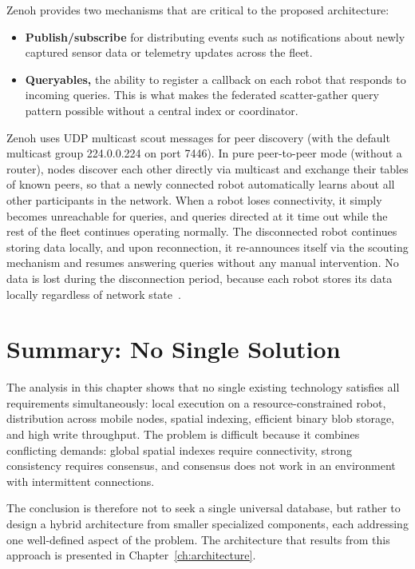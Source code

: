 Zenoh provides two mechanisms that are critical to the proposed architecture:
\begin{itemize}
    \item \textbf{Publish/subscribe} for distributing events such as notifications about newly captured sensor data or telemetry updates across the fleet.
    \item \textbf{Queryables,} the ability to register a callback on each robot that responds to incoming queries. This is what makes the federated scatter-gather query pattern possible without a central index or coordinator.
\end{itemize}

Zenoh uses UDP multicast scout messages for peer discovery (with the default multicast group 224.0.0.224 on port 7446). In pure peer-to-peer mode (without a router), nodes discover each other directly via multicast and exchange their tables of known peers, so that a newly connected robot automatically learns about all other participants in the network. When a robot loses connectivity, it simply becomes unreachable for queries, and queries directed at it time out while the rest of the fleet continues operating normally. The disconnected robot continues storing data locally, and upon reconnection, it re-announces itself via the scouting mechanism and resumes answering queries without any manual intervention. No data is lost during the disconnection period, because each robot stores its data locally regardless of network state~\cite{zhang2024comparison}.


\section{Summary: No Single Solution} \label{sec:existing-solutions-summary}

The analysis in this chapter shows that no single existing technology satisfies all requirements simultaneously: local execution on a resource-constrained robot, distribution across mobile nodes, spatial indexing, efficient binary blob storage, and high write throughput. The problem is difficult because it combines conflicting demands: global spatial indexes require connectivity, strong consistency requires consensus, and consensus does not work in an environment with intermittent connections.

The conclusion is therefore not to seek a single universal database, but rather to design a hybrid architecture from smaller specialized components, each addressing one well-defined aspect of the problem. The architecture that results from this approach is presented in Chapter~\ref{ch:architecture}.

